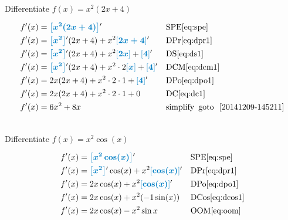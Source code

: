 \begin{example}[id:20141209-144203] \label{20141209-144203} \hfill \\

Differentiate $f(x)=x^2(2x+4)$

\soln

\solnsteps
\begin{align*}
f'(x)&= \farg{x^2(2x+4)}' && \text{SPE} \eqref{eq:spe} \\
f'(x)&= \farg{x^2}'(2x+4)+x^2\farg{2x+4}' && \text{DPr} \eqref{eq:dpr1} \\
f'(x)&= \farg{x^2}'(2x+4)+x^2\farg{2x}+\farg{4}' && \text{DS} \eqref{eq:ds1} \\
f'(x)&= \farg{x^2}'(2x+4)+x^2 \cdot 2 \farg{x}+\farg{4}' && \text{DCM} \eqref{eq:dcm1} \\
f'(x)&= 2x(2x+4)+ x^2\cdot 2 \cdot 1 + \farg{4}' && \text{DPo} \eqref{eq:dpo1} \\
f'(x)&= 2x(2x+4)+ x^2\cdot 2 \cdot 1 + 0 && \text{DC} \eqref{eq:dc1} \\
f'(x)&= 6x^2+8x && \text{simplify} \text{\, goto \,} \, \ref{20141209-145211}\\
\end{align*}
\end{example}


\begin{example}[id:20141209-142321] \label{20141209-142321} \hfill \\

Differentiate $f(x)=x^2 \cos(x)$

\soln

\solnsteps
\begin{align*}
f'(x)&= \farg{x^2 \cos(x)}' && \text{SPE} \eqref{eq:spe} \\
f'(x)&= \farg{x^2}' \cos(x) + x^2 \farg{\cos (x)}' && \text{DPr} \eqref{eq:dpr1} \\
f'(x)&= 2x \cos (x) + x^2 \farg{\cos (x)}' && \text{DPo} \eqref{eq:dpo1} \\
f'(x)&= 2x \cos (x) + x^2 (-1 \sin(x)) && \text{DCos} \eqref{eq:dcos1} \\
f'(x)&= 2x \cos (x) - x^2 \sin x && \text{OOM} \eqref{eq:oom} 
\end{align*}
\end{example}

